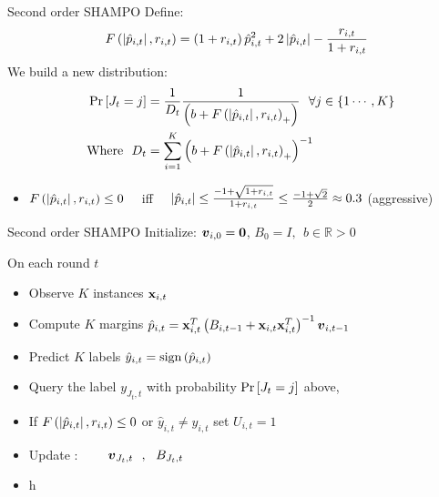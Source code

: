\documentclass{beamer}
\begin{document}
\begin{frame}{Second order SHAMPO}
Define:
\begin{equation*}
F\paren{\abs{\hat{p}_{i,t}},r_{i,t}}=\paren{1+r_{i,t}}\hat{p}_{i,t}^2+2\abs{\hat{p}_{i,t}}-\frac{r_{i,t}}{1+r_{i,t}}\newline
\end{equation*}
We build a new distribution:
\begin{equation*}
\begin{aligned}
{\rm Pr}\left[{J_t=j}\right]&=\frac{1}{D_t}\frac{1}{\left({b+F\left({\left\vert{\hat{p}_{i,t}}\right\vert,r_{i,t}}\right)_{+}}\right)} ~~\forall j\in\left\{{1\cdots,K}\right\}\\
 ~ \textrm{ Where }~
 D_{t}&=\sum_{i=1}^{K}{\left({b+F\left({\left\vert{\hat{p}_{i,t}}\right\vert,r_{i,t}}\right)_{+}}\right)^{-1}}
\end{aligned}
\end{equation*}

\begin{itemize}
\item $F\left({\left\vert{\hat{p}_{i,t}}\right\vert,r_{i,t}}\right)\le0$  ~~iff~~ $\left\vert{\hat{p}_{i,t}}\right\vert\le\frac{-1+\sqrt{1+r_{i,t}}}{1+r_{i,t}}\le\frac{-1+\sqrt{2}}{2}\approx0.3 $  (aggressive)\newline
\end{itemize}
\end{frame}

\begin{frame}{Second order SHAMPO}
Initialize: ${\boldsymbol{v}}_{i,0}={\boldsymbol{0}}$, $B_{0}=I,~~b\in\mathbb{R}>0$\newline

On each round $t$ \newline
\begin{itemize}
\item Observe $K$ instances $\mathbf{x}_{i,t}$ \newline
\item Compute  $K$ margins  $\hat{p}_{i,t}= \mathbf{x}_{i,t}^T\left({B_{i,t-1}+\mathbf{x}_{i,t}\mathbf{x}_{i,t}^T}\right)^{-1}{\boldsymbol{v}}_{i,t-1}$\newline
\item Predict $K$ labels $\hat{y}_{i,t}={\rm sign}\left({\hat{p}_{i,t}}\right)$\newline
\item Query the label $y_{J_t,t}$ with probability  ${\rm Pr}\left[{J_t=j}\right]$ above, \newline
\item If $F\left({\left\vert{\hat{p}_{i,t}}\right\vert,r_{i,t}}\right)\le0$ or $\hat{y}_{i,t}\ne y_{i,t}$ set $U_{i,t}=1$\newline
\item Update :~~~~
${\boldsymbol{v}}_{J_t,t}~~,~~ B_{J_t,t} $\newline
\item h
\end{itemize}

\end{frame}
\end{document}

